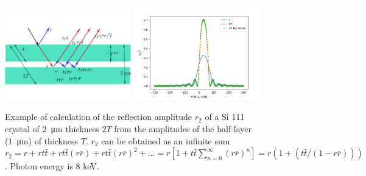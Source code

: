 \documentclass[preprint]{iucr}              %
\begin{document}
\begin{figure}\label{fig:doublelayer}
    \centering
    \includegraphics[width=0.49\textwidth]{figures/figlayered2.pdf}
    \includegraphics[width=0.49\textwidth]{figures/doublelayer2.png}
    \caption{Example of calculation of the reflection amplitude $r_2$ of a Si 111 crystal of \SI{2}{\micro\meter} thickness $2T$ from the amplitudes of the half-layer (\SI{1}{\micro\meter}) of thickness $T$. $r_2$ can be obtained as an infinite sum $r_2 = r + r t \bar{t} + r t \bar{t} (r \bar{r}) + r t \bar{t} (r \bar{r})^2 + ...= r[1 + t \bar{t}\sum_{n=0}^{\infty}(r\bar{r})^n]=r(1 + (t \bar{t} / (1-r \bar{r})))$. Photon energy is 8 keV.
    }
\end{figure}


\end{document}
